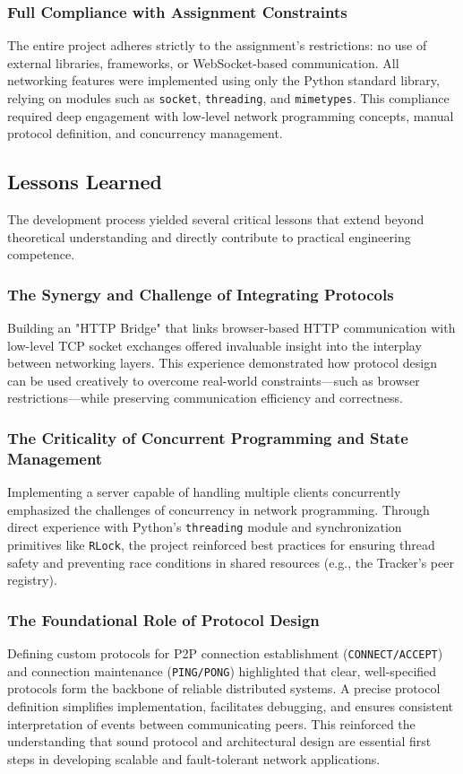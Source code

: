 \subsubsection{Full Compliance with Assignment Constraints}
The entire project adheres strictly to the assignment’s restrictions: no use of external libraries, frameworks, or WebSocket-based communication. 
All networking features were implemented using only the Python standard library, relying on modules such as \texttt{socket}, \texttt{threading}, and \texttt{mimetypes}. 
This compliance required deep engagement with low-level network programming concepts, manual protocol definition, and concurrency management.

\subsection{Lessons Learned}

The development process yielded several critical lessons that extend beyond theoretical understanding and directly contribute to practical engineering competence.

\subsubsection{The Synergy and Challenge of Integrating Protocols}
Building an "HTTP Bridge" that links browser-based HTTP communication with low-level TCP socket exchanges offered invaluable insight into the interplay between networking layers. 
This experience demonstrated how protocol design can be used creatively to overcome real-world constraints—such as browser restrictions—while preserving communication efficiency and correctness.

\subsubsection{The Criticality of Concurrent Programming and State Management}
Implementing a server capable of handling multiple clients concurrently emphasized the challenges of concurrency in network programming. 
Through direct experience with Python’s \texttt{threading} module and synchronization primitives like \texttt{RLock}, the project reinforced best practices for ensuring thread safety and preventing race conditions in shared resources (e.g., the Tracker’s peer registry).

\subsubsection{The Foundational Role of Protocol Design}
Defining custom protocols for P2P connection establishment (\texttt{CONNECT/ACCEPT}) and connection maintenance (\texttt{PING/PONG}) highlighted that clear, well-specified protocols form the backbone of reliable distributed systems. 
A precise protocol definition simplifies implementation, facilitates debugging, and ensures consistent interpretation of events between communicating peers. 
This reinforced the understanding that sound protocol and architectural design are essential first steps in developing scalable and fault-tolerant network applications.

